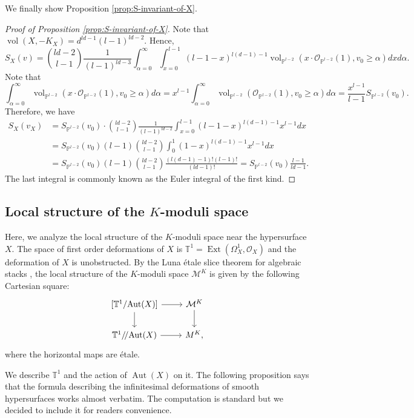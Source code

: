\documentclass[letterpaper,11pt]{amsart}
\theoremstyle{plain}
\theoremstyle{definition}
\theoremstyle{remark}
\newcommand{\bb}[1]{\mathbb{#1}}
\newcommand{\PP}{\mathbb{P}}
\newcommand{\cM}{\mathcal{M}}
\newcommand{\cO}{\mathcal{O}}
\DeclareMathOperator{\Aut}{Aut}
\DeclareMathOperator{\Ext}{Ext}
\DeclareMathOperator{\vol}{vol}
\begin{document}
    We finally show Proposition \ref{prop:S-invariant-of-X}.

    \begin{proof}[Proof of Proposition \ref{prop:S-invariant-of-X}]
        Note that $\vol(X, -K_{X}) = d^{ld-1} (l-1)^{ld-2}.$ Hence,
    $$ S_{X}(v) = {ld-2 \choose l-1} \frac{1}{(l-1)^{ld-3}} \int_{\alpha = 0}^{\infty} \int_{x = 0}^{l-1}  (l-1-x)^{l(d-1)-1} \vol_{\PP^{l-2}}(x\cdot \cO_{\PP^{l-2}}(1), v_{0}\geq \alpha) dxd\alpha.$$
    Note that
    $$ \int_{\alpha = 0}^{\infty} \vol_{\PP^{l-2}}(x\cdot\cO_{\PP^{l-2}}(1), v_{0}\geq \alpha) d\alpha  = x^{l-1} \int_{\alpha = 0}^{\infty} \vol_{\PP^{l-2}} (\cO_{\PP^{l-2}}(1), v_{0}\geq \alpha) d\alpha = \frac{x^{l-1}}{l-1} S_{\PP^{l-2}}(v_{0}).$$
    Therefore, we have
    \begin{align*}
        S_{X}(v_{X}) & = S_{\PP^{l-2}}(v_{0})\cdot {ld-2 \choose l-1} \frac{1}{(l-1)^{ld-2}} \int_{x=0}^{l-1} (l-1-x)^{l(d-1)-1} x^{l-1} dx\\
        & = S_{\PP^{l-2}}(v_{0}) (l-1) {ld-2 \choose l-1} \int_{0}^{1} (1-x)^{l(d-1)-1} x^{l-1} dx \\
        & = S_{\PP^{l-2}}(v_{0}) (l-1) {ld-2 \choose l-1} \frac{(l(d-1)-1)! (l-1)!}{(ld-1)!} = S_{\PP^{l-2}}(v_{0})\frac{l-1}{ld-1} .
    \end{align*}
    The last integral is commonly known as the Euler integral of the first kind.
    \end{proof}
    
    \subsection{Local structure of the $K$-moduli space}
    Here, we analyze the local structure of the $K$-moduli space near the hypersurface $X$. The space of first order deformations of $X$ is $\mathbb{T}^{1} = \Ext(\Omega_{X}^{1}, \cO_{X})$ and the deformation of $X$ is unobstructed. By the Luna étale slice theorem for algebraic stacks \cite{Alper-Hall-Rydh:Luna}, the local structure of the $K$-moduli space $\cM^{K}$ is given by the following Cartesian square:
    $$ \begin{tikzcd}
        {[}\mathbb{T}^{1}/\!\Aut(X){]} \ar[r] \ar[d] & \cM^{K} \ar[d] \\
        \mathbb{T}^{1}/\!/\!\Aut(X) \ar[r]& M^{K},
    \end{tikzcd} $$
    where the horizontal maps are étale.

    We describe $\bb{T}^{1}$ and the action of $\Aut(X)$ on it. The following proposition says that the formula describing the infinitesimal deformations of smooth hypersurfaces works almost verbatim. The computation is standard but we decided to include it for readers convenience.
\end{document}
